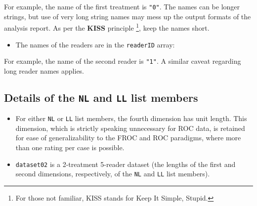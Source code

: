 \documentclass[]{book}
\newenvironment{Shaded}{\begin{snugshade}}{\end{snugshade}}
\newcommand{\CommentTok}[1]{\textcolor[rgb]{0.56,0.35,0.01}{\textit{#1}}}
\newcommand{\KeywordTok}[1]{\textcolor[rgb]{0.13,0.29,0.53}{\textbf{#1}}}
\newcommand{\NormalTok}[1]{#1}
\newcommand{\OperatorTok}[1]{\textcolor[rgb]{0.81,0.36,0.00}{\textbf{#1}}}
\providecommand{\tightlist}{%
  \setlength{\itemsep}{0pt}\setlength{\parskip}{0pt}}
\let\rmarkdownfootnote\footnote%
\def\footnote{\protect\rmarkdownfootnote}
\begin{document}
\begin{Shaded}
\end{Shaded}

For example, the name of the first treatment is \texttt{"0"}. The names can be longer strings, but use of very long string names may mess up the output formats of the analysis report. As per the \textbf{KISS} principle \footnote{For those not familiar, KISS stands for Keep It Simple, Stupid.}, keep the names short.

\begin{itemize}
\tightlist
\item
  The names of the readers are in the \texttt{readerID} array:
\end{itemize}

\begin{Shaded}
\end{Shaded}

For example, the name of the second reader is \texttt{"1"}. A similar caveat regarding long reader names applies.

\hypertarget{details-of-the-nl-and-ll-list-members}{%
\subsection{\texorpdfstring{Details of the \texttt{NL} and \texttt{LL} list members}{Details of the NL and LL list members}}\label{details-of-the-nl-and-ll-list-members}}

\begin{itemize}
\tightlist
\item
  For either \texttt{NL} or \texttt{LL} list members, the fourth dimension has unit length. This dimension, which is strictly speaking unnecessary for ROC data, is retained for ease of generalizability to the FROC and ROC paradigms, where more than one rating per case is possible.
\item
  \texttt{dataset02} is a 2-treatment 5-reader dataset (the lengths of the first and second dimensions, respectively, of the \texttt{NL} and \texttt{LL} list members).
\end{itemize}
\end{document}
